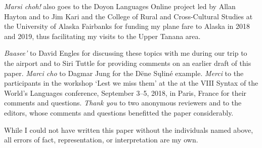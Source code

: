 \documentclass[output=paper,colorlinks,citecolor=brown]{langscibook}
\begin{document}
\textit{Marsi choh!} also goes to the Doyon Languages Online project led by Allan Hayton and to Jim Kari and the College of Rural and Cross-Cultural Studies at the University of Alaska Fairbanks for funding my plane fare to Alaska in 2018 and 2019, thus facilitating my visits to the Upper Tanana area.

\textit{Baasee'} to David Engles for discussing these topics with me during our trip to the airport and to Siri Tuttle for providing comments on an earlier draft of this paper. \textit{Marci cho} to Dagmar Jung for the Dëne Sųłiné example. \textit{Merci} to the participants in the workshop `Lest we miss them' at the at the VIII Syntax of the World's Languages conference, September 3–5, 2018, in Paris, France for their comments and questions. \textit{Thank you} to two anonymous reviewers and to the editors, whose comments and questions benefitted the paper considerably.

While I could not have written this paper without the individuals named above, all errors of fact, representation, or interpretation are my own.

\printbibliography[heading=subbibliography,notkeyword=this]
\end{document}
